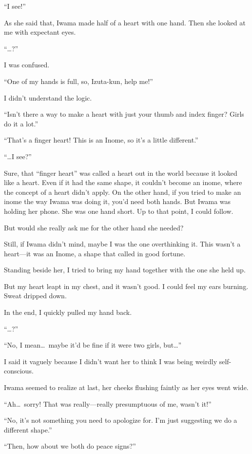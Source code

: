 \documentclass[
    a4paper,
    12pt,
    twoside,
    openany,
    UTF8,
    fontset=windows
]{ctexbook}
\begin{document}
``I see!''

As she said that, Iwama made half of a heart with one hand. Then she looked at me with expectant eyes.

``\dots?''

I was confused.

``One of my hands is full, so, Izuta-kun, help me!''

I didn't understand the logic.

``Isn't there a way to make a heart with just your thumb and index finger? Girls do it a lot.''

``That's a finger heart! This is an Inome, so it's a little different.''

``\dots I see?''

Sure, that ``finger heart'' was called a heart out in the world because it looked like a heart. Even if it had the same shape, it couldn't become an inome, where the concept of a heart didn't apply. On the other hand, if you tried to make an inome the way Iwama was doing it, you'd need both hands. But Iwama was holding her phone. She was one hand short. Up to that point, I could follow.

But would she really ask me for the other hand she needed?

Still, if Iwama didn't mind, maybe I was the one overthinking it. This wasn't a heart---it was an Inome, a shape that called in good fortune.

Standing beside her, I tried to bring my hand together with the one she held up.

But my heart leapt in my chest, and it wasn't good. I could feel my ears burning. Sweat dripped down.

In the end, I quickly pulled my hand back.

``\dots?''

``No, I mean\dots\ maybe it'd be fine if it were two girls, but\dots''

I said it vaguely because I didn't want her to think I was being weirdly self-conscious.

Iwama seemed to realize at last, her cheeks flushing faintly as her eyes went wide.

``Ah\dots\ sorry! That was really---really presumptuous of me, wasn't it!''

``No, it's not something you need to apologize for. I'm just suggesting we do a different shape.''

``Then, how about we both do peace signs?''
\end{document}
